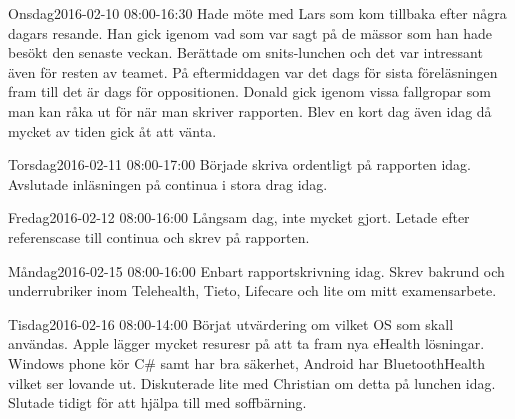 \documentclass[a4paper,oneside]{book}
\begin{document}
\begin{diary}{Onsdag}{2016-02-10 08:00-16:30}
	Hade möte med Lars som kom tillbaka efter några dagars resande. Han gick igenom vad som var sagt på de mässor som han hade besökt den senaste veckan. Berättade om snits-lunchen och det var intressant även för resten av teamet. På eftermiddagen var det dags för sista föreläsningen fram till det är dags för oppositionen. Donald gick igenom vissa fallgropar som man kan råka ut för när man skriver rapporten. Blev en kort dag även idag då mycket av tiden gick åt att vänta.
\end{diary}

\begin{diary}{Torsdag}{2016-02-11 08:00-17:00}
	Började skriva ordentligt på rapporten idag. Avslutade inläsningen på continua i stora drag idag. 
\end{diary}

\begin{diary}{Fredag}{2016-02-12 08:00-16:00}
	Långsam dag, inte mycket gjort. Letade efter referenscase till continua och skrev på rapporten.
\end{diary}
\newpage

\begin{diary}{Måndag}{2016-02-15 08:00-16:00}
	Enbart rapportskrivning idag. Skrev bakrund och underrubriker inom Telehealth, Tieto, Lifecare och lite om mitt examensarbete.
\end{diary}

\begin{diary}{Tisdag}{2016-02-16 08:00-14:00}
	Börjat utvärdering om vilket OS som skall användas. Apple lägger mycket resuresr på att ta fram nya eHealth lösningar. Windows phone kör C\# samt har bra säkerhet, Android har BluetoothHealth vilket ser lovande ut. Diskuterade lite med Christian om detta på lunchen idag. Slutade tidigt för att hjälpa till med soffbärning. 
\end{diary}
\end{document}
